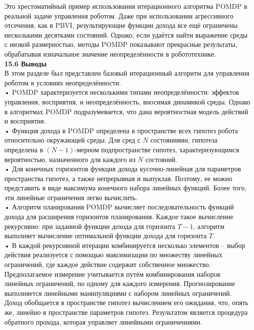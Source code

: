 \documentclass[10pt,a4paper]{article}
\begin{document}
Это хрестоматийный пример использования итерационного алгоритма POMDP в реальной задаче управления роботом. Даже при использовании агрессивного отсечения, как в PBVI, результирующие функции дохода все ещё ограничены несколькими десятками состояний. Однако, если удаётся найти выражение среды с низкой размерностью, методы POMDP показывают прекрасные результаты, обрабатывая изначальное значение неопределённости в робототехнике.\\

\textbf{15.6	Выводы}\\

В этом разделе был представлен базовый  итерационный алгоритм для управления роботом в условиях неопределённости.\\

•	POMDP характеризуется несколькими типами неопределённости: эффектов управления, восприятия, и неопределённость, вносимая динамикой среды. Однако в алгоритмах POMDP подразумевается, что дана вероятностная модель действий и восприятия.\\

•	Функция дохода в POMDP определена в пространстве всех гипотез робота относительно окружающей среды. Для сред с $N$ состояниями, гипотеза определена в $(N-1)$-мерном подпространстве гипотез, характеризующимся вероятностью, назначенного для каждого из $N$ состояний.\\

•	Для конечных горизонтов функция дохода кусочно-линейная для параметров пространства гипотез, а также непрерывная и выпуклая. Поэтому, ее можно представить в виде максимума конечного набора линейных функций. Более того, эти линейные ограничения легко вычислить.\\

•	Алгоритм планирования POMDP вычисляет последовательность функций дохода для расширения горизонтов планирования. Каждое такое вычисление рекурсивно: при заданной функции дохода для горизонта $T-1$, алгоритм выполняет вычисление оптимальной функции дохода для горизонта $T$.\\

•	В каждой рекурсивной итерации комбинируется несколько элементов – выбор действия реализуется с помощью максимизации по множеству линейных ограничений, где каждое действие содержит собственное множество. Предполагаемое измерение учитывается путём комбинирования наборов линейных ограничений, по одному для каждого измерения. Прогнозирование выполняется линейными манипуляциями с набором линейных ограничений. Доход обобщается в пространстве гипотез вычислением его ожидания, что, опять же, линейно в пространстве параметров гипотез. Результатом является процедура обратного прохода, которая управляет линейными ограничениями.\\
\end{document}
